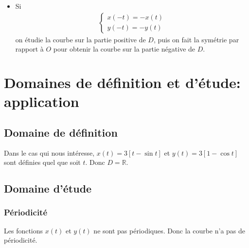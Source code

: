 \documentclass{article}
\begin{document}
\begin{itemize}
\begin{center}
\end{center}
        \item Si
\begin{align*}
\left\{%
\begin{array}{l}
        x(-t) = -x(t)\\
        y(-t) = -y(t)
\end{array}%
\right.
\end{align*}
on étudie la courbe sur la partie positive de $D$, puis on fait la symétrie par
                rapport à $O$ pour obtenir la courbe sur la partie négative de $D$.
\begin{center}
\end{center}
\end{itemize}
\section{Domaines de définition et d'étude: application}
\subsection{Domaine de définition}
Dans le cas qui nous intéresse, $x(t) = 3[t-\sin t]$ et $y(t) = 3[1-\cos t]$ sont définies
quel que soit $t$.
Donc $D=\mathbb{R}$.
\subsection{Domaine d'étude}
\subsubsection{Périodicité}
Les fonctions $x(t)$ et $y(t)$ ne sont pas périodiques.
Donc la courbe n'a pas de périodicité.
\end{document}
